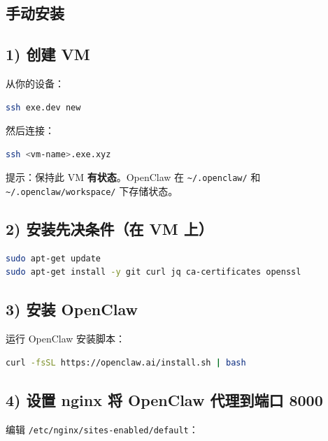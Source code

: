 \subsection{手动安装}


\subsection{1) 创建 VM}


从你的设备：

\begin{lstlisting}[language=bash]
ssh exe.dev new
\end{lstlisting}


然后连接：

\begin{lstlisting}[language=bash]
ssh <vm-name>.exe.xyz
\end{lstlisting}


提示：保持此 VM \textbf{有状态}。OpenClaw 在 \texttt{\textasciitilde{}/.openclaw/} 和 \texttt{\textasciitilde{}/.openclaw/workspace/} 下存储状态。

\subsection{2) 安装先决条件（在 VM 上）}


\begin{lstlisting}[language=bash]
sudo apt-get update
sudo apt-get install -y git curl jq ca-certificates openssl
\end{lstlisting}


\subsection{3) 安装 OpenClaw}


运行 OpenClaw 安装脚本：

\begin{lstlisting}[language=bash]
curl -fsSL https://openclaw.ai/install.sh | bash
\end{lstlisting}


\subsection{4) 设置 nginx 将 OpenClaw 代理到端口 8000}


编辑 \texttt{/etc/nginx/sites-enabled/default}：

